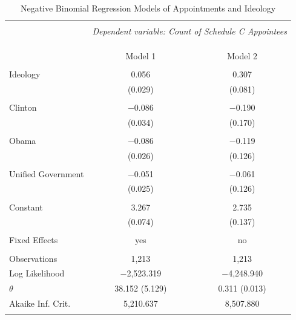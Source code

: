 \documentclass[12pt]{article}
\begin{document}
\begin{table}[!h] \centering 
  \caption{Negative Binomial Regression Models of Appointments and Ideology} 
  \label{} 
\begin{tabular}{@{\extracolsep{5pt}}lcc} 
\\[-1.8ex]\hline 
\hline \\[-1.8ex] 
 & \multicolumn{2}{c}{\textit{Dependent variable: Count of Schedule C Appointees}} \\ 
\cline{2-3} 
\\[-1.8ex] & \multicolumn{2}{c}{} \\ 
\\[-1.8ex] & Model 1 & Model 2\\ 
\hline \\[-1.8ex] 
 Ideology & 0.056 & 0.307 \\ 
  & (0.029) & (0.081) \\ 
  & & \\ 
 Clinton & $-$0.086 & $-$0.190 \\ 
  & (0.034) & (0.170) \\ 
  & & \\ 
 Obama & $-$0.086 & $-$0.119 \\ 
  & (0.026) & (0.126) \\ 
  & & \\ 
 Unified Government & $-$0.051 & $-$0.061 \\ 
  & (0.025) & (0.126) \\ 
  & & \\ 
 Constant & 3.267 & 2.735 \\ 
  & (0.074) & (0.137) \\ 
  & & \\ 
  Fixed Effects & yes & no\\
\hline \\[-1.8ex] 
Observations & 1,213 & 1,213 \\ 
Log Likelihood & $-$2,523.319 & $-$4,248.940 \\ 
$\theta$ & 38.152  (5.129) & 0.311  (0.013) \\ 
Akaike Inf. Crit. & 5,210.637 & 8,507.880 \\ 
\hline 
\hline \\[-1.8ex] 
\end{tabular}
\end{table} 
\end{document}
